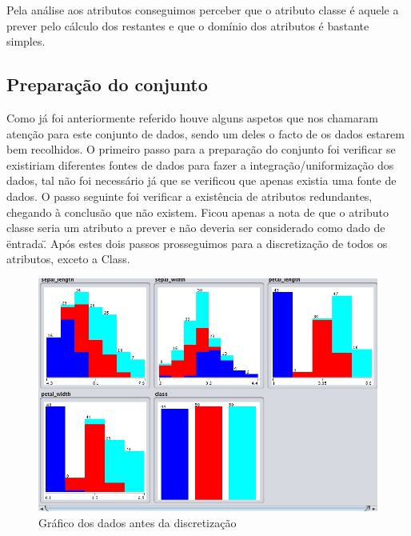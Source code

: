 Pela análise aos atributos conseguimos perceber que o atributo classe é aquele a prever pelo cálculo dos restantes e que o domínio dos atributos é bastante simples.

\subsection{Preparação do conjunto}


Como já foi anteriormente referido houve alguns aspetos que nos chamaram atenção para este conjunto de dados, sendo um deles o facto de os dados estarem bem recolhidos. O primeiro passo para a preparação do conjunto foi verificar se existiriam diferentes fontes de dados para fazer a integração/uniformização dos dados, tal não foi necessário já que se verificou que apenas existia uma fonte de dados.
O passo seguinte foi verificar a existência de atributos redundantes, chegando à conclusão que não existem. Ficou apenas a nota de que o atributo classe seria um atributo a prever e não deveria ser considerado como dado de \"entrada\".
Após estes dois passos prosseguimos para a discretização de todos os atributos, exceto a Class. 

\begin{figure}[H]
    \centering
    \includegraphics[scale=0.4]{tex/img/img2i.jpg}
    \caption{Gráfico dos dados antes da discretização}
    \label{fig:antes}
\end{figure}

